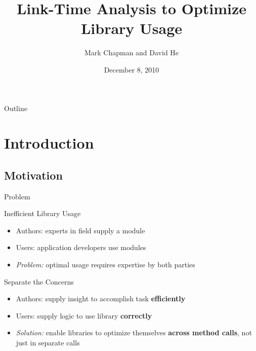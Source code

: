 \documentclass{beamer}
\title[LTO]{Link-Time Analysis to Optimize Library Usage}
\author[Chapman and He]{Mark Chapman and David He}
\institute[CS 706]{CS 706 Final Project}
\date[2010-12-08]{December 8, 2010}
\begin{document}
\begin{frame}
  \titlepage
\end{frame}

\begin{frame}{Outline}
  \tableofcontents
\end{frame}

\section{Introduction}

\subsection{Motivation}

\begin{frame}{Problem}
  \begin{block}{Inefficient Library Usage}
    \begin{itemize}
    \item Authors: experts in field supply a module
    \item Users: application developers use modules
    \item {\it Problem:} optimal usage requires expertise by both parties
    \end{itemize}
  \end{block}
\pause
  \begin{block}{Separate the Concerns}
    \begin{itemize}
    \item Authors: supply insight to accomplish task {\bf efficiently}
    \item Users: supply logic to use library {\bf correctly}
    \item {\it Solution:} enable libraries to optimize themselves {\bf across method calls}, not just in separate calls
    \end{itemize}
  \end{block}
\end{frame}
\end{document}

